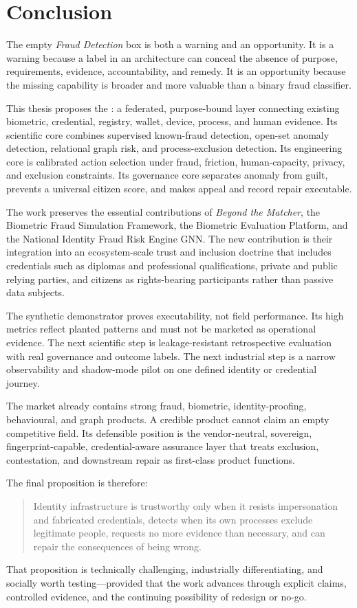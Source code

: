 \chapter{Conclusion}
\begingroup\small

The empty \emph{Fraud Detection} box is both a warning and an opportunity. It is a warning because a label in an architecture can conceal the absence of purpose, requirements, evidence, accountability, and remedy. It is an opportunity because the missing capability is broader and more valuable than a binary fraud classifier.

This thesis proposes the \product: a federated, purpose-bound layer connecting existing biometric, credential, registry, wallet, device, process, and human evidence. Its scientific core combines supervised known-fraud detection, open-set anomaly detection, relational graph risk, and process-exclusion detection. Its engineering core is calibrated action selection under fraud, friction, human-capacity, privacy, and exclusion constraints. Its governance core separates anomaly from guilt, prevents a universal citizen score, and makes appeal and record repair executable.

The work preserves the essential contributions of \emph{Beyond the Matcher}, the Biometric Fraud Simulation Framework, the Biometric Evaluation Platform, and the National Identity Fraud Risk Engine GNN. The new contribution is their integration into an ecosystem-scale trust and inclusion doctrine that includes credentials such as diplomas and professional qualifications, private and public relying parties, and citizens as rights-bearing participants rather than passive data subjects.

The synthetic demonstrator proves executability, not field performance. Its high metrics reflect planted patterns and must not be marketed as operational evidence. The next scientific step is leakage-resistant retrospective evaluation with real governance and outcome labels. The next industrial step is a narrow observability and shadow-mode pilot on one defined identity or credential journey.

The market already contains strong fraud, biometric, identity-proofing, behavioural, and graph products. A credible product cannot claim an empty competitive field. Its defensible position is the vendor-neutral, sovereign, fingerprint-capable, credential-aware assurance layer that treats exclusion, contestation, and downstream repair as first-class product functions.

The final proposition is therefore:

\begin{quote}
Identity infrastructure is trustworthy only when it resists impersonation and fabricated credentials, detects when its own processes exclude legitimate people, requests no more evidence than necessary, and can repair the consequences of being wrong.
\end{quote}

That proposition is technically challenging, industrially differentiating, and socially worth testing---provided that the work advances through explicit claims, controlled evidence, and the continuing possibility of redesign or no-go.
\endgroup
